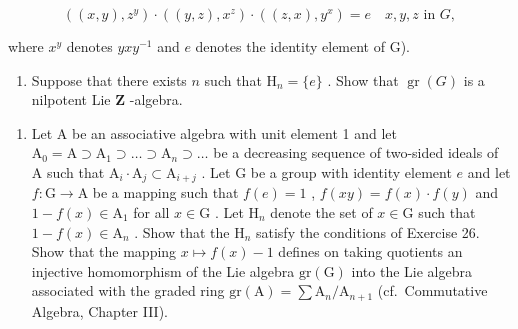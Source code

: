 \[
((x, y), z ^ {y}) \cdot ((y, z), x ^ {z}) \cdot ((z, x), y ^ {x}) = e \quad x, y, z \text {   in   } G,
\]

where \(x^{y}\) denotes \(yxy^{-1}\) and \(e\) denotes the identity element of G).

\begin{enumerate}
\def\labelenumi{(\alph{enumi})}
\setcounter{enumi}{2}
\tightlist
\item
  Suppose that there exists \(n\) such that \(\mathrm{H}_n = \{e\}\) . Show that \(\operatorname{gr}(G)\) is a nilpotent Lie \(\mathbf{Z}\) -algebra.
\end{enumerate}

\begin{enumerate}
\def\labelenumi{\arabic{enumi}.}
\setcounter{enumi}{26}
\tightlist
\item
   Let A be an associative algebra with unit element 1 and let \(\mathrm{A}_0 = \mathrm{A} \supset \mathrm{A}_1 \supset \dots \supset \mathrm{A}_n \supset \dots\) be a decreasing sequence of two-sided ideals of A such that \(\mathrm{A}_i \cdot \mathrm{A}_j \subset \mathrm{A}_{i+j}\) . Let G be a group with identity element \(e\) and let \(f: \mathrm{G} \to \mathrm{A}\) be a mapping such that \(f(e) = 1\) , \(f(xy) = f(x) \cdot f(y)\) and \(1 - f(x) \in \mathrm{A}_1\) for all \(x \in \mathrm{G}\) . Let \(\mathrm{H}_n\) denote the set of \(x \in \mathrm{G}\) such that \(1 - f(x) \in \mathrm{A}_n\) . Show that the \(\mathrm{H}_n\) satisfy the conditions of Exercise 26. Show that the mapping \(x \mapsto f(x) - 1\) defines on taking quotients an injective homomorphism of the Lie algebra \(\mathrm{gr}(\mathrm{G})\) into the Lie algebra associated with the graded ring \(\mathrm{gr}(\mathrm{A}) = \sum \mathrm{A}_n / \mathrm{A}_{n+1}\) (cf.~Commutative Algebra, Chapter III).
\end{enumerate}

